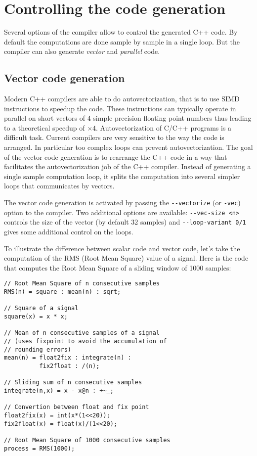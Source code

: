 \chapter{Controlling the code generation}
Several options of the \faust compiler allow to control the generated C++ code. By default the computations are done sample by sample in a single loop. But the compiler can also generate \textit{vector} and \textit{parallel} code.

\section{Vector code generation}
Modern C++ compilers are able to do autovectorization, that is to use SIMD instructions to speedup the code. These instructions can typically operate in parallel on short vectors of 4 simple precision floating point numbers thus leading to a theoretical speedup of $\times4$. 
Autovectorization of C/C++ programs is a difficult task. Current compilers are very sensitive to the way the code is arranged. In particular too complex loops can prevent autovectorization. The goal of the vector code generation is to rearrange the C++ code in a way that facilitates the autovectorization job of the C++ compiler. Instead of generating a single sample computation loop, it splits the computation into several simpler loops that communicates by vectors.

The vector code generation is activated by passing the \lstinline!--vectorize! (or \lstinline!-vec!) option to the \faust compiler. Two additional options are available:  \lstinline!--vec-size <n>! controls the size of the vector (by default 32 samples) and \lstinline!--loop-variant 0/1! gives some additional control on the loops.  

To illustrate the difference between scalar code and vector code, let's take the computation of the RMS (Root Mean Square) value of a signal.  Here is the \faust code that computes the Root Mean Square of a sliding window of 1000 samples:
\label{rms}
\begin{lstlisting}
// Root Mean Square of n consecutive samples
RMS(n) = square : mean(n) : sqrt;

// Square of a signal
square(x) = x * x;

// Mean of n consecutive samples of a signal
// (uses fixpoint to avoid the accumulation of
// rounding errors) 
mean(n) = float2fix : integrate(n) : 
          fix2float : /(n); 

// Sliding sum of n consecutive samples
integrate(n,x) = x - x@n : +~_;

// Convertion between float and fix point
float2fix(x) = int(x*(1<<20));      
fix2float(x) = float(x)/(1<<20);    

// Root Mean Square of 1000 consecutive samples
process = RMS(1000);
\end{lstlisting}

